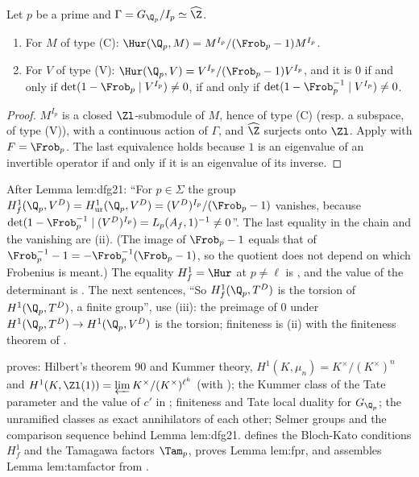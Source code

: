 \begin{proposition}\label{prop:cohomology:unramified}
Let $p$ be a prime and $\Gamma=G_{\Q_p}/I_p\simeq\widehat\Z$.
\begin{enumerate}[label=(\roman*)]
\item For $M$ of type (C): $\Hur(\Q_p,M)=M^{I_p}/(\Frob_p-1)M^{I_p}$.
\item For $V$ of type (V): $\Hur(\Q_p,V)=V^{I_p}/(\Frob_p-1)V^{I_p}$, and it is $0$ if and only if $\det(1-\Frob_p\mid V^{I_p})\ne0$, if and only if
$\det(1-\Frob_p^{-1}\mid V^{I_p})\ne0$.
\end{enumerate}
\end{proposition}

\begin{proof}
$M^{I_p}$ is a closed $\Zl$-submodule of $M$, hence of type (C) (resp. a subspace, of type (V)), with a continuous action of $\Gamma$, and $\widehat\Z$ surjects onto $\Zl$.
Apply  with $F=\Frob_p$. The last equivalence holds because $1$ is an eigenvalue of an invertible operator if and only if it is
an eigenvalue of its inverse.
\end{proof}

\begin{paperlink}\label{pl:cohomology:unramified}
After Lemma lem:dfg21: ``For $p\in\Sigma$ the group $H^1_f(\Q_p,V^D)=H^1_{\mathrm{ur}}(\Q_p,V^D)=(V^D)^{I_p}/(\Frob_p-1)$ vanishes, because
$\det(1-\Frob_p^{-1}\mid(V^D)^{I_p})=L_p(A_f,1)^{-1}\ne0$''. The last equality in the chain and the vanishing are (ii). (The image of $\Frob_p-1$ equals that of
$\Frob_p^{-1}-1=-\Frob_p^{-1}(\Frob_p-1)$, so the quotient does not depend on which Frobenius is meant.) The equality
$H^1_f=\Hur$ at $p\ne\ell$ is , and the value of the determinant is . The next sentences, ``So $H^1_f(\Q_p,T^D)$ is the torsion of
$H^1(\Q_p,T^D)$, a finite group'', use (iii): the preimage of $0$ under $H^1(\Q_p,T^D)\to H^1(\Q_p,V^D)$ is the torsion; finiteness is
(ii) with the finiteness theorem of .
\end{paperlink}

\begin{remark}\label{rem:cohomology:road}
 proves: Hilbert's theorem 90 and Kummer theory, $H^1(K,\mu_n)=K^\times/(K^\times)^n$ and $H^1(K,\Zl(1))=\varprojlim K^\times/(K^\times)^{\ell^k}$ (with
); the Kummer class of the Tate parameter and the value of $c'$ in ; finiteness and Tate local duality for
$G_{\Q_p}$; the unramified classes as exact annihilators of each other; Selmer groups and the comparison sequence behind Lemma lem:dfg21. 
defines the Bloch-Kato conditions $H^1_f$ and the Tamagawa factors $\Tam_p$, proves Lemma lem:fpr, and assembles Lemma lem:tamfactor from .
\end{remark}

